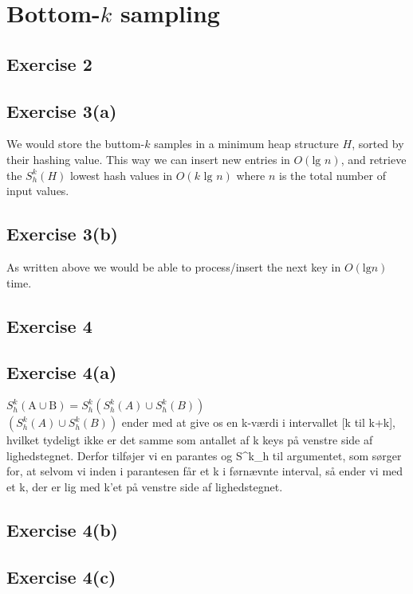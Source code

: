 \section{Bottom-$k$ sampling}

\subsection{Exercise 2}

\subsection{Exercise 3(a)}
We would store the buttom-$k$ samples in a minimum heap structure $H$, sorted by
their hashing value. This way we can insert new entries in $O(\text{lg } n)$,
and retrieve the $S^{k}_{h}(H)$ lowest hash values in $O(k \text{ lg } n)$ where
$n$ is the total number of input values.

\subsection{Exercise 3(b)}
As written above we would be able to process/insert the next key in $O(\text{lg
} n)$ time.


\subsection{Exercise 4}
\subsection{Exercise 4(a)}
$S^{k}_{h}(\text{A} \cup \text{B}) = S^{k}_{h}(S^{k}_{h}(A) \cup S^{k}_{h}(B))$\\

$(S^{k}_{h}(A) \cup S^{k}_{h}(B))$ ender med at give os en k-værdi i intervallet [k til k+k], hvilket tydeligt ikke er det samme som antallet af k keys på venstre side af lighedstegnet. Derfor tilføjer vi en parantes og S^{k}_{h} til argumentet, som sørger for, at selvom vi inden i parantesen får et k i førnævnte interval, så ender vi med et k, der er lig med k'et på venstre side af lighedstegnet. \\



\subsection{Exercise 4(b)}


\subsection{Exercise 4(c)}